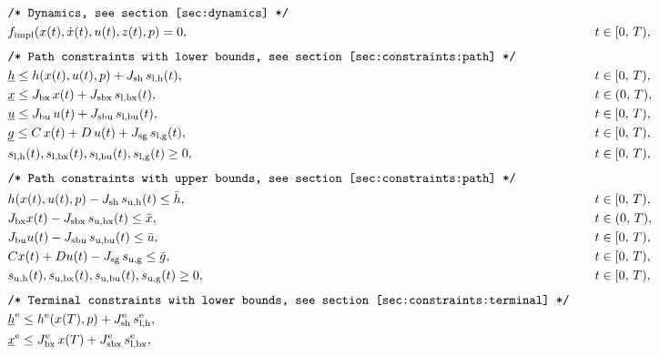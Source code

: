 \documentclass[
a4paper, %
10pt, %
notitlepage,
english]{CSUniSchoolLabReport}
\newcommand{\ind}[1]{_{\textrm{#1}}}
\newcommand{\terminal}{^{\textrm{e}}}
\newcommand{\lowerh}{\ind{l,h}}
\newcommand{\lowerbx}{\ind{l,bx}}
\newcommand{\lowerbu}{\ind{l,bu}}
\newcommand{\lowerg}{\ind{l,g}}
\newcommand{\upperh}{\ind{u,h}}
\newcommand{\upperbx}{\ind{u,bx}}
\newcommand{\upperbu}{\ind{u,bu}}
\newcommand{\upperg}{\ind{u,g}}
\newcommand{\mathComment}[1]{\texttt{/* #1 */}}
\begin{document}
\begin{appendices}
\begin{align}
	&&&\mathComment{Dynamics, see section \ref{sec:dynamics}}\nonumber\\
	&&& f\ind{impl}(x(t), \dot{x}(t), u(t), z(t),p ) = 0, &&\quad t \in [0,\,T), \label{eq:dynamics}\\[1ex]
	&&&\mathComment{Path constraints with lower bounds, see section \ref{sec:constraints:path}}\nonumber\\
	&&&\underline{h} \leq h(x(t), u(t), p) + J_{\textrm{sh}} \, s\lowerh(t), &&\quad t \in [0,\,T),\label{eq:constraints:path:lower_bounds:start}\\
	&&&\underline{x} \leq J_{\textrm{bx}} \, x(t) + J_{\textrm{sbx}} \,s\lowerbx(t), &&\quad t \in (0,\,T),\\
	&&&\underline{u} \leq J_{\textrm{bu}} \,u(t) + J_{\textrm{sbu}} \,s\lowerbu(t), &&\quad t \in [0,\,T),\\
	&&&\underline{g} \leq C\,x(t) + D\,u(t) + J_{\textrm{sg}} \,s\lowerg(t), &&\quad t \in [0,\,T), \\
	&&& s\lowerh (t), s\lowerbx(t), s\lowerbu(t), s\lowerg(t) \geq 0, &&\quad t \in [0,\,T), \label{eq:constraints:path:lower_bounds:end}\\[1ex]
	&&&\mathComment{Path constraints with upper bounds, see section \ref{sec:constraints:path}}\nonumber\\
	&&& h(x(t), u(t), p) - J_{\textrm{sh}} \, s\upperh(t) \leq \bar{h}, &&\quad t \in [0,\,T),\label{eq:constraints:path:upper_bounds:start}\\
	&&& J_{\textrm{bx}} x(t) - J_{\textrm{sbx}}\, s\upperbx(t) \leq \bar{x}, &&\quad t \in (0,\,T),\\
	&&& J_{\textrm{bu}} u(t) - J_{\textrm{sbu}}\, s\upperbu(t)\leq \bar{u}, &&\quad t \in [0,\,T),\\
	&&&Cx(t) + Du(t) - J_{\textrm{sg}}\, s\upperg \leq \bar{g}, &&\quad t \in [0,\,T), \\
	&&& s\upperh(t), s\upperbx(t), s\upperbu(t), s\upperg(t) \geq 0, &&\quad t \in [0,\,T), \label{eq:constraints:path:upper_bounds:end}\\[1ex]
	&&&\mathComment{Terminal constraints with lower bounds, see section \ref{sec:constraints:terminal}}\nonumber\\
	&&&\underline{h}\terminal \leq h\terminal(x(T), p) + J\ind{sh}\terminal\, s\lowerh\terminal, &&\label{eq:constraints:terminal:lower_bounds:start}\\
	&&&\underline{x}\terminal \leq J_{\textrm{bx}}\terminal\, x(T) + J\ind{sbx}\terminal\, s\lowerbx\terminal, &&\\ %

\end{align}
\end{appendices}
\end{document}
